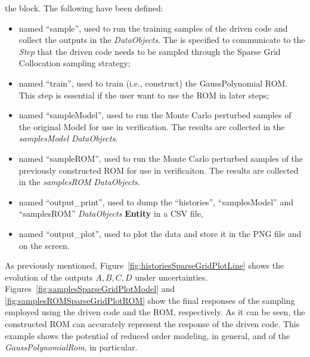 \begin{enumerate}
   the  block.
   The following  have been defined:
   \begin{itemize}
     \item {} named ``sample'', used to run the training
     samples of the driven code and
     collect the outputs in the \textit{DataObjects}.
     The  is specified to communicate to the
     \textit{Step} that the driven code needs to
     be sampled through the Sparse Grid Collocation sampling strategy;
     \item {} named ``train'', used to train (i.e.,
     construct) the GaussPolynomial ROM. This step is essential if the
     user want to use the ROM in later steps;
     \item {} named ``sampleModel'', used to run the
     Monte Carlo perturbed samples of the original Model for use in verification.  The results are
     collected in the \textit{samplesModel} \textit{DataObjects}.
     \item {} named ``sampleROM'', used to run the
     Monte Carlo perturbed samples of the previously constructed ROM for use in verificaiton.  The results are
     collected in the \textit{samplesROM} \textit{DataObjects}.
     \item  {} named ``output\_print'', used to dump
     the ``histories'', ``samplesModel'' and ``samplesROM'' \textit{DataObjects}
     \textbf{Entity} in a CSV file,
     \item  {} named ``output\_plot'', used to
     plot the data and store it in the PNG file and
     on the screen.
   \end{itemize}
\end{enumerate}
 As previously mentioned, Figure~\ref{fig:historiesSparseGridPlotLine}
 shows the evolution of the outputs $A,B,C,D$ under uncertainties.
 Figures~\ref{fig:samplesSparseGridPlotModel} and
 \ref{fig:samplesROMSparseGridPlotROM} show the final responses
 of the sampling employed using the driven code and the ROM,
 respectively. As it can be seen, the constructed ROM can accurately
 represent the response of the driven code. This example shows the
 potential of reduced order modeling, in general, and of the
 \textit{GaussPolynomialRom}, in particular.

